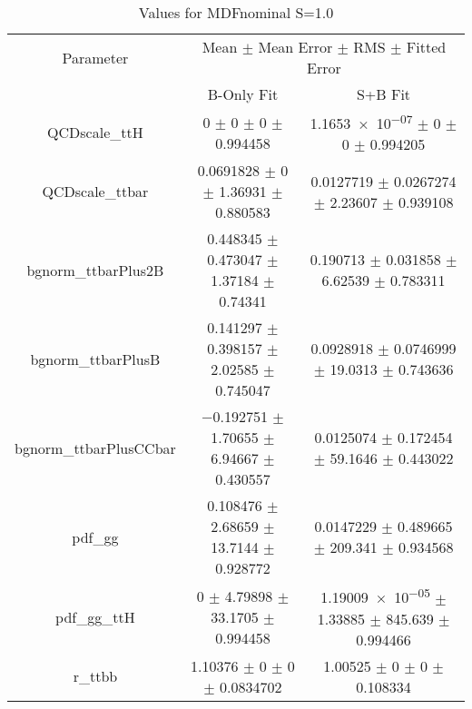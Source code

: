 \begin{table}
\centering
\caption{Values for MDFnominal S=1.0}
\begin{tabular}{ccc}
\toprule
Parameter & \multicolumn{2}{c}{Mean $\pm$ Mean Error $\pm$ RMS $\pm$ Fitted Error}\\
 & B-Only Fit & S+B Fit\\
\midrule
QCDscale\_ttH & \num{0} $\pm$ \num{0} $\pm$ \num{0} $\pm$ \num{0.994458} & \num{1.1653e-07} $\pm$ \num{0} $\pm$ \num{0} $\pm$ \num{0.994205}\\
QCDscale\_ttbar & \num{0.0691828} $\pm$ \num{0} $\pm$ \num{1.36931} $\pm$ \num{0.880583} & \num{0.0127719} $\pm$ \num{0.0267274} $\pm$ \num{2.23607} $\pm$ \num{0.939108}\\
bgnorm\_ttbarPlus2B & \num{0.448345} $\pm$ \num{0.473047} $\pm$ \num{1.37184} $\pm$ \num{0.74341} & \num{0.190713} $\pm$ \num{0.031858} $\pm$ \num{6.62539} $\pm$ \num{0.783311}\\
bgnorm\_ttbarPlusB & \num{0.141297} $\pm$ \num{0.398157} $\pm$ \num{2.02585} $\pm$ \num{0.745047} & \num{0.0928918} $\pm$ \num{0.0746999} $\pm$ \num{19.0313} $\pm$ \num{0.743636}\\
bgnorm\_ttbarPlusCCbar & \num{-0.192751} $\pm$ \num{1.70655} $\pm$ \num{6.94667} $\pm$ \num{0.430557} & \num{0.0125074} $\pm$ \num{0.172454} $\pm$ \num{59.1646} $\pm$ \num{0.443022}\\
pdf\_gg & \num{0.108476} $\pm$ \num{2.68659} $\pm$ \num{13.7144} $\pm$ \num{0.928772} & \num{0.0147229} $\pm$ \num{0.489665} $\pm$ \num{209.341} $\pm$ \num{0.934568}\\
pdf\_gg\_ttH & \num{0} $\pm$ \num{4.79898} $\pm$ \num{33.1705} $\pm$ \num{0.994458} & \num{1.19009e-05} $\pm$ \num{1.33885} $\pm$ \num{845.639} $\pm$ \num{0.994466}\\
r\_ttbb & \num{1.10376} $\pm$ \num{0} $\pm$ \num{0} $\pm$ \num{0.0834702} & \num{1.00525} $\pm$ \num{0} $\pm$ \num{0} $\pm$ \num{0.108334}\\
\bottomrule
\end{tabular}
\end{table}